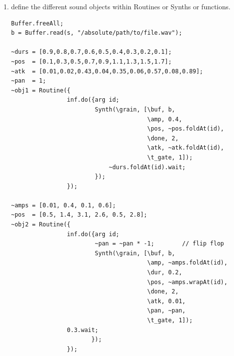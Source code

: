 \begin{itemize}
\begin{enumerate}
\item define the different sound objects within Routines or Synths or functions.
\begin{lstlisting}[frame=single] 
Buffer.freeAll;
b = Buffer.read(s, "/absolute/path/to/file.wav");

~durs = [0.9,0.8,0.7,0.6,0.5,0.4,0.3,0.2,0.1];       
~pos  = [0.1,0.3,0.5,0.7,0.9,1.1,1.3,1.5,1.7];
~atk  = [0.01,0.02,0.43,0.04,0.35,0.06,0.57,0.08,0.89];    
~pan  = 1;  
~obj1 = Routine({
                inf.do({arg id;                              
                        Synth(\grain, [\buf, b, 
                                       \amp, 0.4, 
                                       \pos, ~pos.foldAt(id), 
                                       \done, 2, 
                                       \atk, ~atk.foldAt(id), 
                                       \t_gate, 1]);
		                    ~durs.foldAt(id).wait;                 
                        });
                });

~amps = [0.01, 0.4, 0.1, 0.6];
~pos  = [0.5, 1.4, 3.1, 2.6, 0.5, 2.8];
~obj2 = Routine({
                inf.do({arg id;             
                        ~pan = ~pan * -1;        // flip flop                 
                        Synth(\grain, [\buf, b, 
                                       \amp, ~amps.foldAt(id),
                                       \dur, 0.2, 
                                       \pos, ~amps.wrapAt(id),
                                       \done, 2, 
                                       \atk, 0.01, 
                                       \pan, ~pan,
                                       \t_gate, 1]);
		        0.3.wait;                 
                       });
                });
\end{lstlisting}


\end{enumerate}
\end{itemize}
